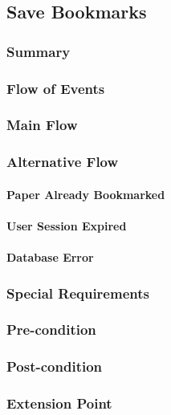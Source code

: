 \subsection{Save Bookmarks}
\subsubsection{Summary}

\subsubsection{Flow of Events}
\subsubsection*{Main Flow}

\subsubsection*{Alternative Flow}
\paragraph{Paper Already Bookmarked}

\paragraph{User Session Expired}

\paragraph{Database Error}

\subsubsection{Special Requirements}

\subsubsection{Pre-condition}

\subsubsection{Post-condition}

\subsubsection*{Extension Point}